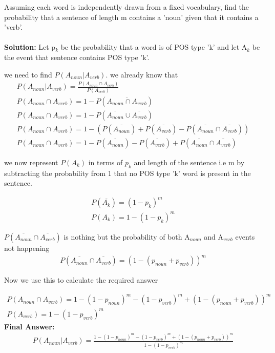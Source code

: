 \documentclass[12pt]{article}
\begin{document}
Assuming each word is independently drawn from a fixed vocabulary, find the probability that a sentence of length m contains a 'noun' given that it contains a 'verb'.\\ \\
\textbf{Solution:}
Let p$_{k}$ be the probability that a word is of POS type 'k' and let A$_{k}$ be the event that sentence contains POS type 'k'.

we need to find $P(A_{noun}|A_{verb})$. we already know that
\begin{gather*}
    P(A_{noun}|A_{verb}) = \frac{P(A_{noun}\cap A_{verb})}{P(A_{verb})}\\
    P(A_{noun}\cap A_{verb}) = 1 - P(\overline{A_{noun}\cap A_{verb}})\\
    P(A_{noun}\cap A_{verb}) = 1 - P(\overline{A_{noun}}\cup \overline{A_{verb}})\\
    P(A_{noun}\cap A_{verb}) = 1 - (P(\overline{A_{noun}}) + P(\overline{A_{verb}}) - P(\overline{A_{noun}}\cap \overline{A_{verb}}))\\
    P(A_{noun}\cap A_{verb}) = 1 - P(\overline{A_{noun}}) - P(\overline{A_{verb}}) + P(\overline{A_{noun}}\cap \overline{A_{verb}})
\end{gather*}

we now represent $P(A_{k})$ in terms of $p_{k}$ and length of the sentence i.e m by subtracting the probability from 1 that no POS type 'k' word is present in the sentence.

\begin{gather*}
    P(\overline{A_{k}}) = (1-p_{k})^m\\
    P(A_{k}) = 1 - (1-p_{k})^m
\end{gather*}

$P(\overline{A_{noun}}\cap \overline{A_{verb}})$ is nothing but the probability of both A$_{noun}$ and A$_{verb}$ events not happening
\begin{gather*}
    P(\overline{A_{noun}}\cap \overline{A_{verb}}) = (1-(p_{noun}+p_{verb}))^m
\end{gather*}

Now we use this to calculate the required answer

\begin{gather*}
    P(A_{noun}\cap A_{verb}) = 1 - (1-p_{noun})^m - (1-p_{verb})^m + (1-(p_{noun}+p_{verb}))^m\\
    P(A_{verb}) = 1 - (1-p_{verb})^m
\end{gather*}
\textbf{Final Answer:}
\begin{gather*}
    P(A_{noun}|A_{verb}) = \frac{1 - (1-p_{noun})^m - (1-p_{verb})^m + (1-(p_{noun}+p_{verb}))^m}{1 - (1-p_{verb})^m}
\end{gather*}
\end{document}

